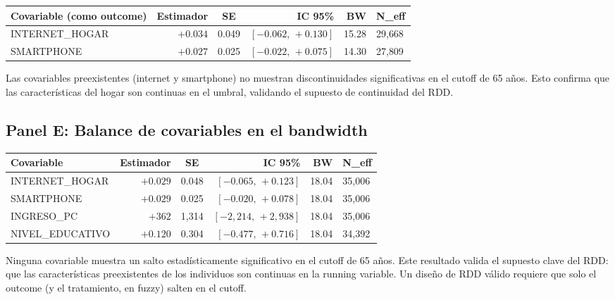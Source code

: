 \documentclass[12pt, a4paper]{article}
\begin{document}
\begin{center}
\begin{tabular}{lrcrrl}
\toprule
Covariable (como outcome) & Estimador & SE & IC 95\% & BW & N\_eff \\
\midrule
INTERNET\_HOGAR & $+0.034$ & 0.049 & $[-0.062,\,+0.130]$ & 15.28 & 29{,}668 \\
SMARTPHONE & $+0.027$ & 0.025 & $[-0.022,\,+0.075]$ & 14.30 & 27{,}809 \\
\bottomrule
\end{tabular}
\end{center}

\begin{interpcaja}[Interpretación]
Las covariables preexistentes (internet y smartphone) no muestran
discontinuidades significativas en el cutoff de 65 años. Esto confirma
que las características del hogar son continuas en el umbral, validando el
supuesto de continuidad del RDD.
\end{interpcaja}

\subsection{Panel E: Balance de covariables en el bandwidth}

\begin{center}
\begin{tabular}{lrcrrl}
\toprule
Covariable & Estimador & SE & IC 95\% & BW & N\_eff \\
\midrule
INTERNET\_HOGAR & $+0.029$ & 0.048 & $[-0.065,\,+0.123]$ & 18.04 & 35{,}006 \\
SMARTPHONE & $+0.029$ & 0.025 & $[-0.020,\,+0.078]$ & 18.04 & 35{,}006 \\
INGRESO\_PC & $+362$ & 1{,}314 & $[-2{,}214,\,+2{,}938]$ & 18.04 & 35{,}006 \\
NIVEL\_EDUCATIVO & $+0.120$ & 0.304 & $[-0.477,\,+0.716]$ & 18.04 & 34{,}392 \\
\bottomrule
\end{tabular}
\end{center}

\begin{resultcaja}[Interpretación]
Ninguna covariable muestra un salto estadísticamente significativo en el
cutoff de 65 años. Este resultado valida el supuesto clave del RDD: que
las características preexistentes de los individuos son continuas en la
running variable. Un diseño de RDD válido requiere que solo el outcome
(y el tratamiento, en fuzzy) salten en el cutoff.
\end{resultcaja}
\end{document}
